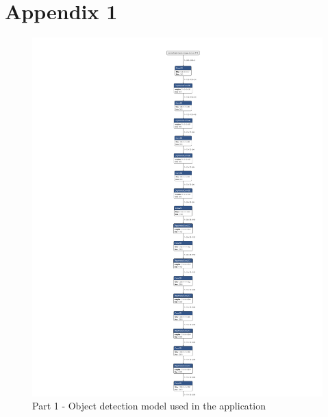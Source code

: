 \chapter{Appendix 1}
\begin{figure}
    \centering
    \includegraphics[width=\textwidth]{figure/detect.tflite_1.png}
    \caption{Part 1 - Object detection model used in the application}
    \label{Apend:object_detect_model_1}
\end{figure}

